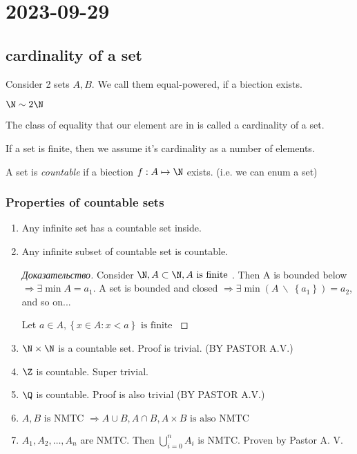 \section{2023-09-29}

\subsection{cardinality of a set}

\begin{definition}[]
	Consider 2 sets $A, B$. We call them equal-powered, if a biection exists. 
\end{definition}

\begin{example}[]
	$\N \sim 2\N$
\end{example}

\begin{definition}[]
	The class of equality that our element are in is called a cardinality of a set. 
\end{definition}

If a set is finite, then we assume it's cardinality as a number of elements.

A set is \textit{countable} if a biection $f: A \mapsto \N$ exists. (i.e. we can enum a set)

\subsubsection{Properties of countable sets}

\begin{enumerate}
	\item Any infinite set has a countable set inside.
	\item Any infinite subset of countable set is countable. 
		\begin{proof}[Доказательство]
			Consider $\N, A \subset \N, A \text{ is finite } $. Then A is bounded below $ \Rightarrow \exists \min A = a_1$. A set is bounded and closed $ \Rightarrow \exists \min(A \ \backslash \  \left\{ a_1 \right \} ) = a_2$, and so on... 

			Let $a \in A, \left\{ x \in A: x < a \right \} \text{ is finite } $
		\end{proof}
	\item $\N \times \N$ is a countable set. Proof is trivial. (BY PASTOR A.V.) 
	\item $\Z$ is countable. Super trivial.
	\item $\Q$ is countable. Proof is also trivial (BY PASTOR A.V.) 
	\item $A,B \text{ is NMTC } \Rightarrow A \cup B, A \cap B, A \times B \text{ is also NMTC } $
	\item $A_1, A_2, \dots, A_n$ are NMTC. Then $\bigcup_{i = 0} ^ n A_i$ is NMTC. Proven by Pastor A. V. 
\end{enumerate}

